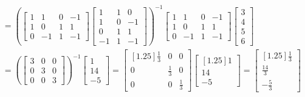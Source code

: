 \documentclass[letter,11pt]{article}
\theoremstyle{definition}
\begin{document}
\begin{tcolorbox}[boxrule=1mm,enhanced jigsaw, breakable,before=\hfill,after=\hfill,adjusted title={Problem 5 solutions}]
\begin{enumerate}[label = \roman*.]
\begin{align}
            &= \left(\begin{bmatrix} 1 & 1 & 0 & -1\\ 1 & 0 & 1 & 1\\ 0 &-1&1&-1\end{bmatrix}\begin{bmatrix}1 & 1 & 0 \\ 1 & 0 & -1 \\ 0 & 1 & 1 \\ -1 & 1 & -1 \end{bmatrix}\right)^{-1}\begin{bmatrix} 1 & 1 & 0 & -1\\ 1 & 0 & 1 & 1\\ 0 &-1&1&-1\end{bmatrix} \begin{bmatrix} 3 \\ 4 \\ 5 \\ 6 \end{bmatrix}\\
            &= \left(\begin{bmatrix} 3 & 0 & 0 \\ 0 & 3 & 0\\ 0 & 0 & 3
            \end{bmatrix}\right)^{-1} \begin{bmatrix} 1 \\ 14 \\ -5 \end{bmatrix}= \begin{bmatrix}[1.25]\frac{1}{3} & 0 & 0 \\ 0 & \frac{1}{3} & 0 \\ 0 & 0 & \frac{1}{3} \end{bmatrix}\begin{bmatrix}[1.25] 1 \\ 14 \\ -5 \end{bmatrix} = \begin{bmatrix}[1.25] \frac{1}{3} \\ \frac{14}{3} \\ -\frac{5}{3} \end{bmatrix} 
        \end{align}


\end{enumerate}
\end{tcolorbox}
\end{document}
